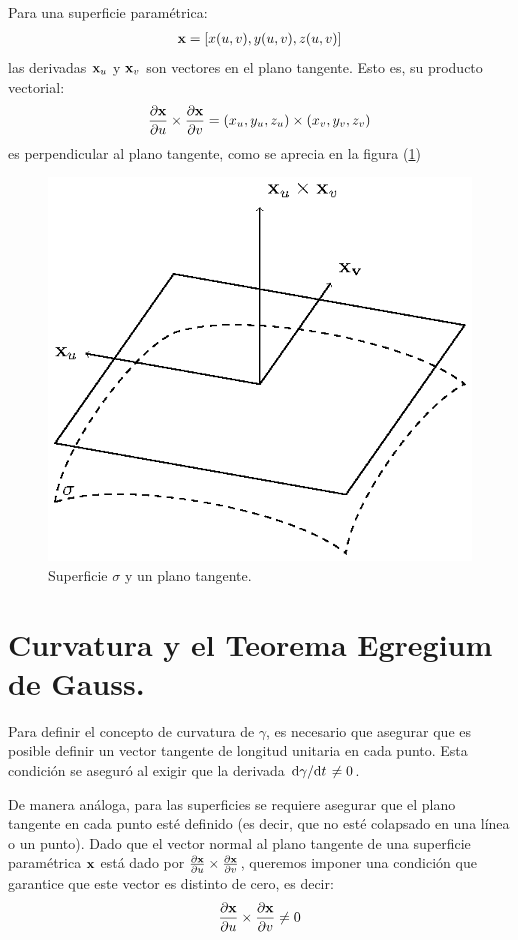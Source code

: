 Para una superficie paramétrica:
\begin{align*}
\vb{x} = [x(u, v), y(u, v), z(u, v)]
\end{align*}
las derivadas $\vb{x}_{u}$ y $\vb{x}_{v}$ son vectores en el plano tangente. Esto es, su producto vectorial:
\begin{align*}
\pdv{\vb{x}}{u} \times \pdv{\vb{x}}{v} = (x_{u}, y_{u}, z_{u}) \times (x_{v}, y_{v}, z_{v})
\end{align*}
es perpendicular al plano tangente, como se aprecia en la figura (\ref{fig:figura_02_plano_tangente})
\begin{figure}[H]
    \centering
    \includegraphics[scale=1]{Imagenes/Superficies_05_Plano_Tangente.eps}
    \caption{Superficie $\sigma$ y un plano tangente.}
    \label{fig:figura_02_plano_tangente}
\end{figure}

\section{Curvatura y el Teorema Egregium de Gauss.}

Para definir el concepto de curvatura de $\gamma$, es necesario que asegurar que es posible definir un vector tangente de longitud unitaria en cada punto. Esta condición se aseguró al exigir que la derivada $\dv*{\gamma}{t} \neq 0$.
\par
De manera análoga, para las superficies se requiere asegurar que el plano tangente en cada punto esté definido (es decir, que no esté colapsado en una línea o un punto). Dado que el vector normal al plano tangente de una superficie paramétrica $\vb{x}$ está dado por $\pdv{\vb{x}}{u} \times \pdv{\vb{x}}{v}$, queremos imponer una condición que garantice que este vector es distinto de cero, es decir:
\begin{align*}
\pdv{\vb{x}}{u} \times \pdv{\vb{x}}{v} \neq 0
\end{align*}

